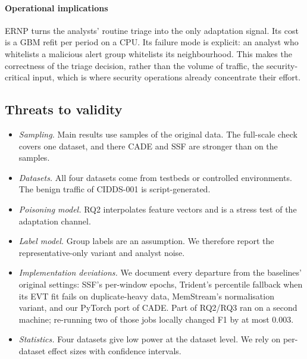 \documentclass[preprint,12pt]{elsarticle}
\begin{document}
\paragraph{Operational implications}
ERNP turns the analysts' routine triage into the only adaptation signal. Its cost is a GBM refit per period on a CPU. Its failure mode is explicit: an analyst who whitelists a malicious alert group whitelists its neighbourhood. This makes the correctness of the triage decision, rather than the volume of traffic, the security-critical input, which is where security operations already concentrate their effort.

\subsection{Threats to validity}\label{sec:threats}
\begin{itemize}
\item \emph{Sampling.} Main results use samples of the original data. The full-scale check covers one dataset, and there CADE and SSF are stronger than on the samples.
\item \emph{Datasets.} All four datasets come from testbeds or controlled environments. The benign traffic of CIDDS-001 is script-generated.
\item \emph{Poisoning model.} RQ2 interpolates feature vectors and is a stress test of the adaptation channel.
\item \emph{Label model.} Group labels are an assumption. We therefore report the representative-only variant and analyst noise.
\item \emph{Implementation deviations.} We document every departure from the baselines' original settings: SSF's per-window epochs, Trident's percentile fallback when its EVT fit fails on duplicate-heavy data, MemStream's normalisation variant, and our PyTorch port of CADE. Part of RQ2/RQ3 ran on a second machine; re-running two of those jobs locally changed F1 by at most 0.003.
\item \emph{Statistics.} Four datasets give low power at the dataset level. We rely on per-dataset effect sizes with confidence intervals.
\end{itemize}

\end{document}

